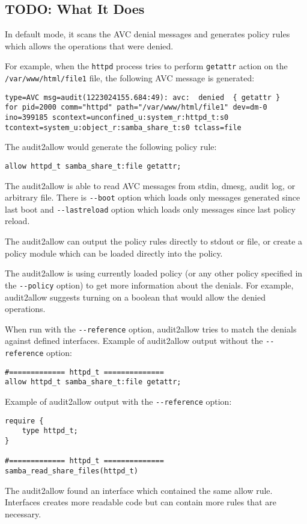 \subsection{TODO: What It Does}
In default mode, it scans the AVC denial messages and generates policy rules
which allows the operations that were denied.

For example, when the \texttt{httpd} process tries to perform \texttt{getattr}
action on the \texttt{/var/www/html/file1} file, the following AVC message is
generated:
\begin{lstlisting}
type=AVC msg=audit(1223024155.684:49): avc:  denied  { getattr }
for pid=2000 comm="httpd" path="/var/www/html/file1" dev=dm-0
ino=399185 scontext=unconfined_u:system_r:httpd_t:s0
tcontext=system_u:object_r:samba_share_t:s0 tclass=file
\end{lstlisting}
The audit2allow would generate the following policy rule:
\begin{lstlisting}
allow httpd_t samba_share_t:file getattr;
\end{lstlisting}

The audit2allow is able to read AVC messages from stdin, dmesg, audit log, or
arbitrary file. There is \texttt{-{}-boot} option which loads only messages
generated since last boot and \texttt{-{}-lastreload} option which loads only
messages since last policy reload.

The audit2allow can output the policy rules directly to stdout or file, or
create a policy module which can be loaded directly into the policy.

The audit2allow is using currently loaded policy (or any other policy specified
in the \texttt{-{}-policy} option) to get more information about the denials.
For example, audit2allow suggests turning on a boolean that would allow the
denied operations.

When run with the \texttt{-{}-reference} option, audit2allow tries to match the
denials against defined interfaces. Example of audit2allow output without the
\texttt{-{}-reference} option:
\begin{lstlisting}
#============= httpd_t ==============
allow httpd_t samba_share_t:file getattr;
\end{lstlisting}
Example of audit2allow output with the \texttt{-{}-reference} option:
\begin{lstlisting}
require {
	type httpd_t;
}

#============= httpd_t ==============
samba_read_share_files(httpd_t)
\end{lstlisting}
The audit2allow found an interface which contained the same allow
rule. Interfaces creates more readable code but can contain more rules that are
necessary.

